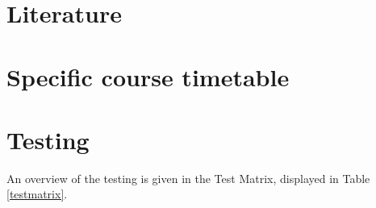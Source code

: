 \documentclass[a4paper,12pt]{report}
\begin{document}
\chapter{Literature}



\chapter{Specific course timetable}



\chapter{Testing}
An overview of the testing is given in the Test Matrix, displayed in Table \ref{testmatrix}.

\begingroup

\setlength{\tabcolsep}{10pt} %
\renewcommand{\arraystretch}{1.5} %
\end{document}
